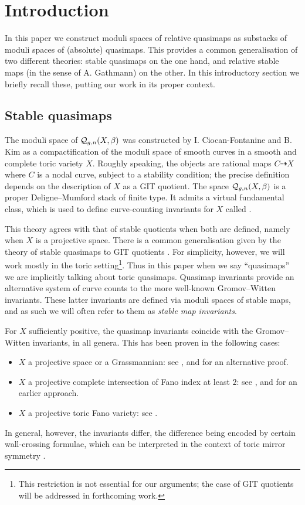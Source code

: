 \section{Introduction}
In this paper we construct moduli spaces of relative quasimaps as substacks of moduli spaces of (absolute) quasimaps. This provides a common generalisation of two different theories: stable quasimaps on the one hand, and relative stable maps (in the sense of A. Gathmann) on the other. In this introductory section we briefly recall these, putting our work in its proper context.

\subsection{Stable quasimaps}
The moduli space of  $\mathcal{Q}_{g,n}(X,\beta)$ was constructed by I. Ciocan-Fontanine and B. Kim \cite{CF-K} as a compactification of the moduli space of smooth curves in a smooth and complete toric variety $X$. Roughly speaking, the objects are rational maps $C \dashrightarrow X$ where $C$ is a nodal curve, subject to a stability condition; the precise definition depends on the description of $X$ as a GIT quotient.  The space $\mathcal{Q}_{g,n}(X,\beta)$ is a proper Deligne--Mumford stack of finite type.  It admits a virtual fundamental class, which is used to define curve-counting invariants for $X$ called .

This theory agrees with that of stable quotients \cite{MOP} when both are defined, namely when $X$ is a projective space.  There is a common generalisation given by the theory of stable quasimaps to GIT quotients \cite{CFKM}. For simplicity, however, we will work mostly in the toric setting\footnote{This restriction is not essential for our arguments; the case of GIT quotients will be addressed in forthcoming work.}. Thus in this paper when we say ``quasimaps'' we are implicitly talking about toric quasimaps.
Quasimap invariants provide an alternative system of curve counts to the more well-known Gromov--Witten invariants. These latter invariants are defined via moduli spaces of stable maps, and as such we will often refer to them as \emph{stable map invariants}.

For $X$ sufficiently positive, the quasimap invariants coincide with the Gromov--Witten invariants, in all genera. This has been proven in the following cases:
\begin{itemize}[leftmargin=0.7cm]
\item $X$ a projective space or a Grassmannian: see \cite[Theorems~ 3~and~4]{MOP}, and \cite{ManolacheStable} for an alternative proof.
\item $X$ a projective complete intersection of Fano index at least $2$: see \cite[Corollary 1.7]{CF-K-MirrorSymmetry}, and \cite{CZ-mirror} for an earlier approach.
\item $X$ a projective toric Fano variety: see \cite[Corollary 1.3]{CF-K-higher-genus}.
\end{itemize}
In general, however, the invariants differ, the difference being encoded by certain wall-crossing formulae, which can be interpreted in the context of toric mirror symmetry \cite{CF-K-wallcrossing}.

